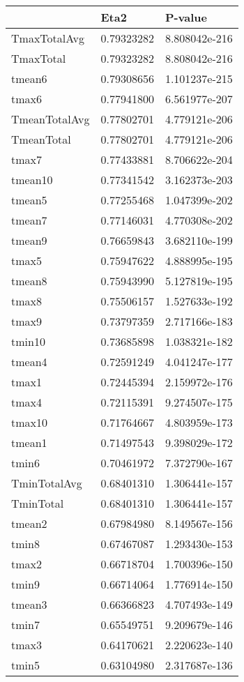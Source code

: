 \begin{table}[H]
	\centering
	\label{ClusterVarImp}
	\begin{tabular}{lll}
		& Eta2       & P-value       \\
		\hline
		TmaxTotalAvg   & 0.79323282 & 8.808042e-216 \\
		TmaxTotal      & 0.79323282 & 8.808042e-216 \\
		tmean6         & 0.79308656 & 1.101237e-215 \\
		tmax6          & 0.77941800 & 6.561977e-207 \\
		TmeanTotalAvg  & 0.77802701 & 4.779121e-206 \\
		TmeanTotal     & 0.77802701 & 4.779121e-206 \\
		tmax7          & 0.77433881 & 8.706622e-204 \\
		tmean10        & 0.77341542 & 3.162373e-203 \\
		tmean5         & 0.77255468 & 1.047399e-202 \\
		tmean7         & 0.77146031 & 4.770308e-202 \\
		tmean9         & 0.76659843 & 3.682110e-199 \\
		tmax5          & 0.75947622 & 4.888995e-195 \\
		tmean8         & 0.75943990 & 5.127819e-195 \\
		tmax8          & 0.75506157 & 1.527633e-192 \\
		tmax9          & 0.73797359 & 2.717166e-183 \\
		tmin10         & 0.73685898 & 1.038321e-182 \\
		tmean4         & 0.72591249 & 4.041247e-177 \\
		tmax1          & 0.72445394 & 2.159972e-176 \\
		tmax4          & 0.72115391 & 9.274507e-175 \\
		tmax10         & 0.71764667 & 4.803959e-173 \\
		tmean1         & 0.71497543 & 9.398029e-172 \\
		tmin6          & 0.70461972 & 7.372790e-167 \\
		TminTotalAvg   & 0.68401310 & 1.306441e-157 \\
		TminTotal      & 0.68401310 & 1.306441e-157 \\
		tmean2         & 0.67984980 & 8.149567e-156 \\
		tmin8          & 0.67467087 & 1.293430e-153 \\
		tmax2          & 0.66718704 & 1.700396e-150 \\
		tmin9          & 0.66714064 & 1.776914e-150 \\
		tmean3         & 0.66366823 & 4.707493e-149 \\
		tmin7          & 0.65549751 & 9.209679e-146 \\
		tmax3          & 0.64170621 & 2.220623e-140 \\
		tmin5          & 0.63104980 & 2.317687e-136 \\
	\end{tabular}
\end{table}
